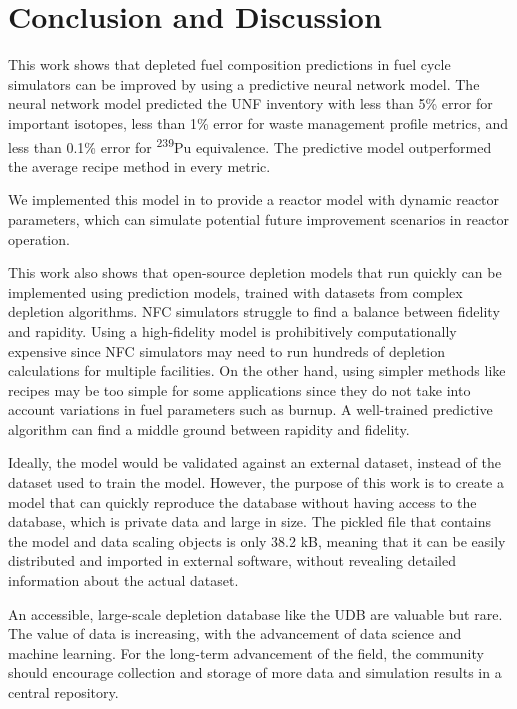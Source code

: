 \section{Conclusion and Discussion}

This work shows that depleted fuel composition predictions
in fuel cycle simulators can be improved
by using a predictive neural network  model.
The neural network model predicted the \gls{UNF} inventory
with less than 5\% error for important isotopes,
less than 1\% error for waste management profile metrics, 
and less than 0.1\% error for \textsuperscript{239}Pu equivalence.
The predictive model outperformed the average recipe
method in every metric.

We implemented this model in \Cyclus to provide a
 reactor model with dynamic reactor parameters,
which can simulate potential future improvement scenarios
in reactor operation.

This work also shows that open-source depletion models
that run quickly
can be implemented using prediction models, trained
with datasets from complex depletion algorithms.
\gls{NFC} simulators struggle to find a balance
between fidelity and rapidity. Using a high-fidelity
model is prohibitively computationally expensive
since \gls{NFC} simulators may need to run
hundreds of depletion calculations for multiple
facilities. On the other hand, using simpler methods
like recipes may be too simple for some applications
since they do not take into account variations in fuel
parameters such as burnup.
A well-trained predictive algorithm can find a middle
ground between rapidity and fidelity.

Ideally, the model would be validated against an external
dataset, instead of the dataset used to train the model.
 However, the purpose
of this work is to create a model that can quickly reproduce the
database without having access to the database, which is private
data
and large in size. The pickled file that contains
the model and data scaling objects is only 38.2 kB, meaning that it
can be easily distributed and imported in external software, without
revealing detailed information about the actual dataset.

An accessible, large-scale depletion database 
like the \gls{UDB} are valuable
but rare. The value of data is increasing,
with the advancement of data science and machine learning.
For the long-term advancement of the field, the
community should encourage collection and storage of more
data and simulation results in
a central repository.

